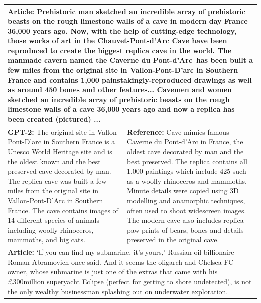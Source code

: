 \documentclass{article}
\begin{document}
{\renewcommand{\arraystretch}{2}%
\begin{table}[t]
\begin{center}
\begin{tabular}{|p{8cm}|p{8cm}|}
\hline
\multicolumn{2}{|C{16cm}|}{
\textbf{Article:} Prehistoric man sketched an incredible array of prehistoric beasts on the rough limestone walls of a cave in modern day France 36,000 years ago.
\newline
Now, with the help of cutting-edge technology, those works of art in the Chauvet-Pont-d'Arc Cave have been reproduced to create the biggest replica cave in the world.
\newline
The manmade cavern named the Caverne du Pont-d'Arc has been built a few miles from the original site in Vallon-Pont-D'arc in Southern France and contains 1,000 painstakingly-reproduced drawings as well as around 450 bones and other features...
\newline
Cavemen and women sketched an incredible array of prehistoric beasts on the rough limestone walls of a cave 36,000 years ago and now a replica has been created (pictured)
\newline
...
} \\
\hline
\textbf{GPT-2:} The original site in Vallon-Pont-D'arc in Southern France is a Unesco World Heritage site and is the oldest known and the best preserved cave decorated by man.
The replica cave was built a few miles from the original site in Vallon-Pont-D'Arc in Southern France.
The cave contains images of 14 different species of animals including woolly rhinoceros, mammoths, and big cats.
& \textbf{Reference:} Cave mimics famous Caverne du Pont-d'Arc in France, the oldest cave decorated by man and the best preserved. The replica  contains all 1,000 paintings which include 425 such as a woolly rhinoceros and mammoths. Minute details were copied using 3D modelling and anamorphic techniques, often used to shoot widescreen images. The modern cave also includes replica paw prints of bears, bones and details preserved in the original cave.
\\
\hline
\multicolumn{2}{|C{16cm}|}{
\textbf{Article:} `If you can find my submarine, it's yours,' Russian oil billionaire Roman Abramovich once said.
\newline
And it seems the oligarch and Chelsea FC owner, whose submarine is just one of the extras that came with his £300million superyacht Eclipse (perfect for getting to shore undetected), is not the only wealthy businessman splashing out on underwater exploration.
\newline
}
\end{tabular}
\end{center}
\end{table}}
\end{document}
